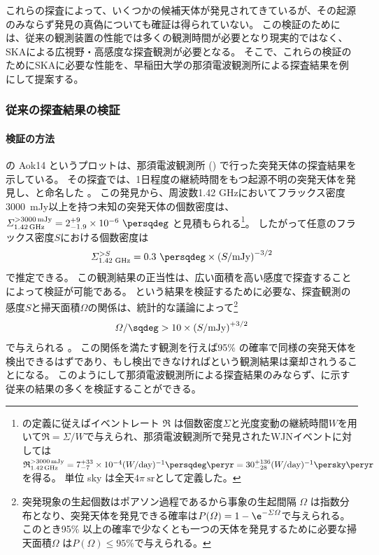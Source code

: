 {これらの探査によって、いくつかの候補天体が発見されてきているが、その起源のみならず発見の真偽についても確証は得られていない。
この検証のためには、従来の観測装置の性能では多くの観測時間が必要となり現実的ではなく、SKAによる広視野・高感度な探査観測が必要となる。
そこで、これらの検証のためにSKAに必要な性能を、早稲田大学の那須電波観測所による探査結果を例にして提案する。

\subsubsection{従来の探査結果の検証}
\paragraph{検証の方法}
の Aok14 というプロットは、那須電波観測所 () で行った突発天体の探査結果を示している。
その探査では、1日程度の継続時間をもつ起源不明の突発天体を発見し、\WJN と命名した \citep{2007ApJ...657L..37N}。
この発見から、周波数1.42 GHzにおいてフラックス密度3000~mJy以上を持つ未知の突発天体の個数密度は、$\varSigma \suffix{3000}{1.42} = 2^{+9}_{-1.9} \times 10^{-6}~\persqdeg$ と見積もられる\footnote{
\citet{2010ApJ...711..517O}の定義に従えばイベントレート $\mathfrak{R}$ は個数密度$\varSigma$と光度変動の継続時間$W$を用いて$\mathfrak{R} = \varSigma / W$で与えられ、那須電波観測所で発見されたWJNイベントに対しては$%
	\mathfrak{R}\suffix{3000}{1.42} = 7^{+33}_{-7} \times 10^{-4}(W/\text{day})^{-1} \persqdeg \peryr 
	= 30^{+136}_{-28} (W/\text{day})^{-1} \persky \peryr%
$
を得る。
単位 sky は全天$4\pi~\text{sr}$として定義した。
}。
したがって任意のフラックス密度$S$における個数密度は
\begin{equation}
	\varSigma^{>S}_{\text{1.42~GHz}} = 0.3~\persqdeg \times \left(  S/\text{mJy} \right)^{-3/2}
	\label{eq:transients.s3.unknowns.nasu-dens}
\end{equation}
で推定できる。
この観測結果の正当性は、広い面積を高い感度で探査することによって検証が可能である。
という結果を検証するために必要な、探査観測の感度$S$と掃天面積$\varOmega$の関係は、統計的な議論によって\footnote{
突発現象の生起個数はポアソン過程であるから事象の生起間隔 $\varOmega$ は指数分布となり、突発天体を発見できる確率は$P(\varOmega)=1-\e^{-\varSigma \varOmega}$で与えられる。
このとき95\% 以上の確率で少なくとも一つの天体を発見するために必要な掃天面積$\varOmega$ は$P(\varOmega) \leq 95\%$で与えられる。
}
\begin{equation}
	\varOmega / \sqdeg > 10 \times \left( S/\text{mJy} \right)^{+3/2}
	\label{eq:transients.s3.unknowns.survey-config}
\end{equation}
で与えられる \citep{2014ApJ...781...10A}。
この関係を満たす観測を行えば95\% の確率で同様の突発天体を検出できるはずであり、もし検出できなければという観測結果は棄却されうることになる。
このようにして那須電波観測所による探査結果のみならず、に示す従来の結果の多くを検証することができる。

}
